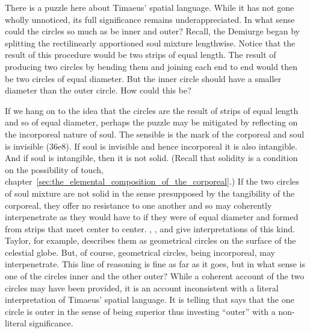 There is a puzzle here about Timaeus' spatial language. While it has not gone wholly unnoticed, its full significance remains underappreciated. In what sense could the circles so much as be inner and outer? Recall, the Demiurge began by splitting the rectilinearly apportioned soul mixture lengthwise. Notice that the result of this procedure would be two strips of equal length. The result of producing two circles by bending them and joining each end to end would then be two circles of equal diameter. But the inner circle should have a smaller diameter than the outer circle. How could this be?

If we hang on to the idea that the circles are the result of strips of equal length and so of equal diameter, perhaps the puzzle may be mitigated by reflecting on the incorporeal nature of soul. The sensible is the mark of the corporeal and soul is invisible (36e8). If soul is invisible and hence incorporeal it is also intangible. And if soul is intangible, then it is not solid. (Recall that solidity is a condition on the possibility of touch, chapter~\ref{sec:the_elemental_composition_of_the_corporeal}.) If the two circles of soul mixture are not solid in the sense presupposed by the tangibility of the corporeal, they offer no resistance to one another and so may coherently interpenetrate as they would have to if they were of equal diameter and formed from strips that meet center to center. \citet[111--2 n7]{Archer-Hind:1888qd}, \citet[148]{Taylor:1928qb}, and \citet[120--1]{Dicks:1970aa} give interpretations of this kind. Taylor, for example, describes them as geometrical circles on the surface of the celestial globe. But, of course, geometrical circles, being incorporeal, may interpenetrate. This line of reasoning is fine as far as it goes, but in what sense is one of the circles inner and the other outer? While a coherent account of the two circles may have been provided, it is an account inconsistent with a literal interpretation of Timaeus' spatial language. It is telling that \citet[112 n3]{Archer-Hind:1888qd} says that the one circle is outer in the sense of being superior thus investing ``outer'' with a non-literal significance.


